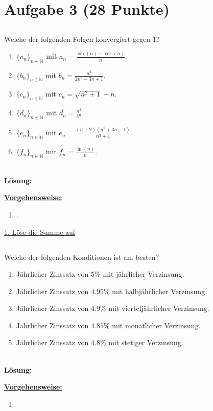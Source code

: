 \section*{Aufgabe 3 (28 Punkte)}
\vspace{0.4cm}
\subsection*{}
Welche der folgenden Folgen konvergiert gegen $1$?
\renewcommand{\labelenumi}{(\alph{enumi})}
\begin{enumerate}
	\item 
	$ \{a_n\}_{n \in \mathbb{N}} $ mit $a_n = \frac{\sin(n) - \cos(n)}{n}$.
	\item
	$ \{b_n\}_{n \in \mathbb{N}} $ mit $b_n = \frac{n^2}{2n^2 - 3n +1 }$.
	\item
	$ \{c_n\}_{n \in \mathbb{N}} $ mit $c_n = \sqrt{n^2 + 1 }  - n$.
	\item
	$ \{d_n\}_{n \in \mathbb{N}} $ mit $d_n = \frac{n^2}{e^n}$.
	\item
	$ \{e_n\}_{n \in \mathbb{N}} $ mit $e_n = \frac{(n+2)(n^2 + 3n -1 )}{n^3 + 4 }$.
	\item
	$ \{f_n\}_{n \in \mathbb{N}} $ mit $f_n = \frac{\ln(n)}{n}$.
\end{enumerate}
\ \\
\textbf{Lösung:}
\begin{mdframed}
\underline{\textbf{Vorgehensweise:}}
\renewcommand{\labelenumi}{\theenumi.}
\begin{enumerate}
\item .
\end{enumerate}
\end{mdframed}

\underline{1. Löse die Summe auf}\\


\newpage

\subsection*{}
Welche der folgenden Konditionen ist am besten?
\renewcommand{\labelenumi}{(\alph{enumi})}
\begin{enumerate}
	\item 
	Jährlicher Zinssatz von $5 \%$ mit jährlicher Verzinsung.
	\item
	Jährlicher Zinssatz von $4.95 \%$ mit halbjährlicher Verzinsung.
	\item
	Jährlicher Zinssatz von $4.9 \%$ mit vierteljährlicher Verzinsung.
	\item
	Jährlicher Zinssatz von $4.85 \%$ mit monatlicher Verzinsung.
	\item
	Jährlicher Zinssatz von $4.8 \%$ mit stetiger Verzinsung.	
\end{enumerate}
\ \\
\textbf{Lösung:}
\begin{mdframed}
\underline{\textbf{Vorgehensweise:}}
\renewcommand{\labelenumi}{\theenumi.}
\begin{enumerate}
\item 
\end{enumerate}
\end{mdframed}


